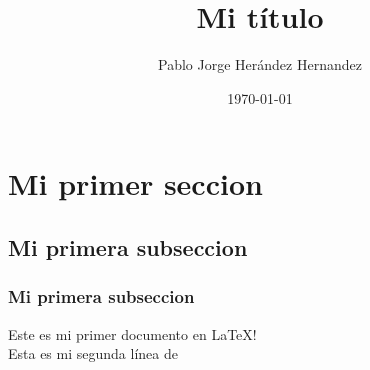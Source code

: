 \documentclass{article} %
\title{Mi t\'itulo}
\date{\today}
\author{Pablo Jorge Her\'andez Hernandez}
\begin{document}
\tableofcontents



%


\section{Mi primer seccion}
\subsection{Mi primera subseccion}
\subsubsection{Mi primera subseccion}

Este es mi primer documento en \LaTeX!\\

Esta es mi segunda l\'inea de 
\end{document}
